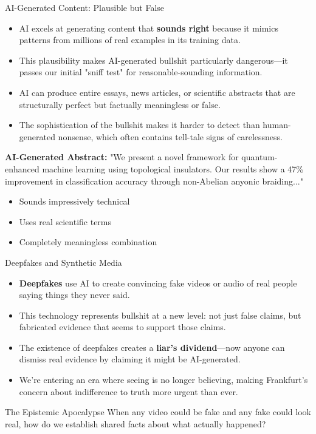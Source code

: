 \documentclass{beamer}
\begin{document}
	\begin{frame}{AI-Generated Content: Plausible but False}
		\begin{itemize}
			\item AI excels at generating content that \textbf{sounds right} because it mimics patterns from millions of real examples in its training data.
			\item This plausibility makes AI-generated bullshit particularly dangerous—it passes our initial "sniff test" for reasonable-sounding information.
			\item AI can produce entire essays, news articles, or scientific abstracts that are structurally perfect but factually meaningless or false.
			\item The sophistication of the bullshit makes it harder to detect than human-generated nonsense, which often contains tell-tale signs of carelessness.
		\end{itemize}
		
		\begin{example}
			\scriptsize
			\textbf{AI-Generated Abstract:}
			"We present a novel framework for quantum-enhanced machine learning using topological insulators. Our results show a 47\% improvement in classification accuracy through non-Abelian anyonic braiding..."
			\begin{itemize}
				\item Sounds impressively technical 
				\item Uses real scientific terms 
				\item Completely meaningless combination 
			\end{itemize}
		\end{example}
	\end{frame}
	
	\begin{frame}{Deepfakes and Synthetic Media}
		\begin{itemize}
			\item \textbf{Deepfakes} use AI to create convincing fake videos or audio of real people saying things they never said.
			\item This technology represents bullshit at a new level: not just false claims, but fabricated evidence that seems to support those claims.
			\item The existence of deepfakes creates a \textbf{liar's dividend}—now anyone can dismiss real evidence by claiming it might be AI-generated.
			\item We're entering an era where seeing is no longer believing, making Frankfurt's concern about indifference to truth more urgent than ever.
		\end{itemize}
		
		\begin{alertblock}{The Epistemic Apocalypse}
			When any video could be fake and any fake could look real, how do we establish shared facts about what actually happened?
		\end{alertblock}
	\end{frame}
	
\end{document}
